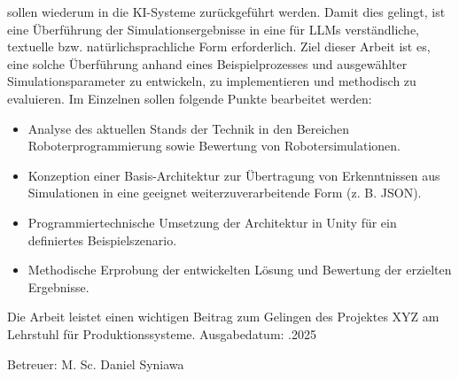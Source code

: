 \begin{titlepage}
  sollen wiederum in die KI-Systeme zurückgeführt werden. Damit dies
  gelingt, ist eine Überführung der Simulationsergebnisse in eine für
  LLMs verständliche, textuelle bzw. natürlichsprachliche Form erforderlich.
  \bigbreak
  Ziel dieser Arbeit ist es, eine solche Überführung anhand eines
  Beispielprozesses und ausgewählter Simulationsparameter zu
  entwickeln, zu implementieren und methodisch zu evaluieren.
  \bigbreak
  Im Einzelnen sollen folgende Punkte bearbeitet werden:
  \begin{itemize}
    \item Analyse des aktuellen Stands der Technik in den Bereichen
      Roboterprogrammierung sowie Bewertung von Robotersimulationen.
    \item Konzeption einer Basis-Architektur zur Übertragung von
      Erkenntnissen aus Simulationen in eine geeignet
      weiterzuverarbeitende Form (z. B. JSON).
    \item Programmiertechnische Umsetzung der Architektur in Unity
      für ein definiertes Beispielszenario.
    \item Methodische Erprobung der entwickelten Lösung und Bewertung
      der erzielten Ergebnisse.
  \end{itemize}
  \bigbreak
  Die Arbeit leistet einen wichtigen Beitrag zum Gelingen des
  Projektes XYZ am Lehrstuhl
  für Produktionssysteme.
  \bigbreak
  Ausgabedatum: .2025\par
  Betreuer: M. Sc. Daniel Syniawa

\end{titlepage}
